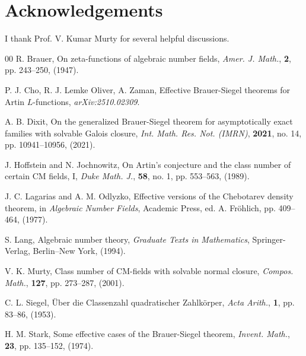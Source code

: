 \documentclass[12pt]{amsart}
\theoremstyle{definition}
\begin{document}
% 

\section*{Acknowledgements}
% 
I thank Prof. V. Kumar Murty for several helpful discussions.

\begin{thebibliography}{00}
R. Brauer, On zeta-functions of algebraic number fields, {\it Amer. J. Math.}, \textbf{2}, pp. 243--250, (1947).

P. J. Cho, R. J. Lemke Oliver, A. Zaman, Effective Brauer-Siegel theorems for Artin $L$-functions, {\it arXiv:2510.02309}.

A. B. Dixit, On the generalized Brauer-Siegel theorem for asymptotically exact families with solvable Galois closure, {\it Int. Math. Res. Not. (IMRN)}, \textbf{2021}, no. 14, pp. 10941--10956, (2021).

J. Hoffstein and N. Jochnowitz, On Artin’s conjecture and the class number of certain CM fields, I, {\it Duke Math. J.}, \textbf{58}, no. 1, pp. 553--563, (1989).

J. C. Lagarias and A. M. Odlyzko, Effective versions of the Chebotarev density theorem, in {\it Algebraic Number Fields}, Academic Press, ed. A. Fr\"ohlich, pp. 409--464, (1977).

S. Lang, Algebraic number theory, {\it Graduate Texts in Mathematics}, Springer-Verlag, Berlin--New York, (1994).

V. K. Murty, Class number of CM-fields with solvable normal closure, {\it Compos. Math.}, \textbf{127}, pp. 273--287, (2001).

C. L. Siegel, \"Uber die Classenzahl quadratischer Zahlk\"orper, {\it Acta Arith.}, \textbf{1}, pp. 83--86, (1953).


H. M. Stark, Some effective cases of the Brauer-Siegel theorem, {\it Invent. Math.}, \textbf{23}, pp. 135--152, (1974).


\end{thebibliography}
\end{document}
